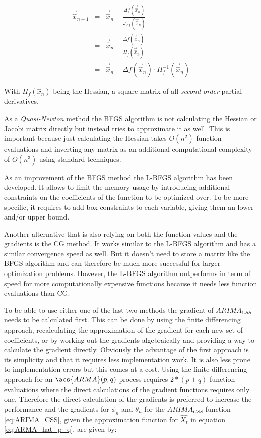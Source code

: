 \begin{equation}\label{eq:newtons_method_multivariate_extrema}
	\begin{array}{lcl}
		\vec{\hat{x}}_{n+1} &=&\vec{\hat{x}}_{n} - \frac{\Delta f(\vec{\hat{x}}_{n})}{J_{\Delta f}(\vec{\hat{x}}_{n})}\\
		&=&\vec{\hat{x}}_{n} - \frac{\Delta f(\vec{\hat{x}}_{n})}{H_{f}(\vec{\hat{x}}_{n})}\\
		&=& \vec{\hat{x}}_{n} - \Delta f(\vec{\hat{x}}_{n}) \cdot H_{f}^{-1}(\vec{\hat{x}}_{n})
	\end{array}
\end{equation}

With $H_f(\hat{x}_{n})$ being the Hessian, a square matrix of all \textit{second-order} partial derivatives.

As a \textit{Quasi-Newton} method the \acs{BFGS} algorithm is not calculating the Hessian or Jacobi matrix directly but instead tries to approximate it as well. This is important because just calculating the Hessian takes $O(n^2)$ function evaluations and inverting any matrix as an additional computational complexity of $O(n^3)$ using standard techniques.


As an improvement of the \acs{BFGS} method the \acl{L-BFGS} algorithm has been developed. It allows to limit the memory usage by introducing additional constraints on the coefficients of the function to be optimized over. To be more specific, it requires to add box constraints to each variable, giving them an lower and/or upper bound. \textsuperscript{\cite{TeamROptimization}}

Another alternative that is also relying on both the function values and the gradients is the \acl{CG} method. It works similar to the \acs{L-BFGS} algorithm and has a similar convergence speed as well. But it doesn't need to store a matrix like the \acs{BFGS} algorithm and can therefore be much more successful for larger optimization problems. However, the \acs{L-BFGS} algorithm outperforms in term of speed for more computationally expensive functions because it needs less function evaluations than \acs{CG}.\textsuperscript{\cite{ALGLibUnconstrainedCG}}

To be able to use either one of the last two methods the gradient of $ARIMA_{CSS}$ needs to be calculated first. This can be done by using the finite differencing approach, recalculating the approximation of the gradient for each new set of coefficients, or by working out the gradients algebraically and providing a way to calculate the gradient directly. Obviously the advantage of the first approach is its simplicity and that it requires less implementation work. It is also less prone to implementation errors but this comes at a cost. Using the finite differencing approach for an $\acs{ARMA}(p,q)$ process requires $2*(p+q)$ function evaluations where the direct calculations of the gradient functions requires only one. Therefore the direct calculation of the gradients is preferred to increase the performance and the gradients for $\phi_n$ and $\theta_n$ for the $ARIMA_{CSS}$ function \eqref{eq:ARIMA_CSS}, given the approximation function for $\hat{X_t}$ in equation \ref{eq:ARMA_hat_p_q}, are given by:

